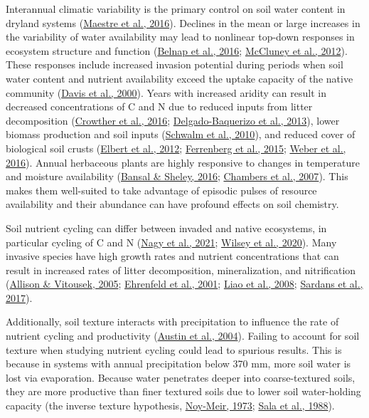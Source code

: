 \documentclass[
  11pt,
  a4paper,
]{article}
\begin{document}
Interannual climatic variability is the primary control on soil water content in dryland systems (\protect\hyperlink{ref-Maestre2016}{Maestre et al., 2016}). Declines in the mean or large increases in the variability of water availability may lead to nonlinear top-down responses in ecosystem structure and function (\protect\hyperlink{ref-Belnap2016}{Belnap et al., 2016}; \protect\hyperlink{ref-McCluney2012}{McCluney et al., 2012}). These responses include increased invasion potential during periods when soil water content and nutrient availability exceed the uptake capacity of the native community (\protect\hyperlink{ref-Davis2000}{Davis et al., 2000}). Years with increased aridity can result in decreased concentrations of C and N due to reduced inputs from litter decomposition (\protect\hyperlink{ref-Crowther2016}{Crowther et al., 2016}; \protect\hyperlink{ref-Delgado-Baquerizo2013}{Delgado-Baquerizo et al., 2013}), lower biomass production and soil inputs (\protect\hyperlink{ref-Schwalm2010}{Schwalm et al., 2010}), and reduced cover of biological soil crusts (\protect\hyperlink{ref-Elbert2012}{Elbert et al., 2012}; \protect\hyperlink{ref-Ferrenberg2015}{Ferrenberg et al., 2015}; \protect\hyperlink{ref-Weber2016}{Weber et al., 2016}). Annual herbaceous plants are highly responsive to changes in temperature and moisture availability (\protect\hyperlink{ref-Bansal2016}{Bansal \& Sheley, 2016}; \protect\hyperlink{ref-Chambers2007}{Chambers et al., 2007}). This makes them well-suited to take advantage of episodic pulses of resource availability and their abundance can have profound effects on soil chemistry.

Soil nutrient cycling can differ between invaded and native ecosystems, in particular cycling of C and N (\protect\hyperlink{ref-Nagy2021}{Nagy et al., 2021}; \protect\hyperlink{ref-Wilsey2020}{Wilsey et al., 2020}). Many invasive species have high growth rates and nutrient concentrations that can result in increased rates of litter decomposition, mineralization, and nitrification (\protect\hyperlink{ref-Allison2005}{Allison \& Vitousek, 2005}; \protect\hyperlink{ref-Ehrenfeld2001}{Ehrenfeld et al., 2001}; \protect\hyperlink{ref-Liao2008}{Liao et al., 2008}; \protect\hyperlink{ref-Sardans2017}{Sardans et al., 2017}).

Additionally, soil texture interacts with precipitation to influence the rate of nutrient cycling and productivity (\protect\hyperlink{ref-Austin2004}{Austin et al., 2004}). Failing to account for soil texture when studying nutrient cycling could lead to spurious results. This is because in systems with annual precipitation below 370 mm, more soil water is lost via evaporation. Because water penetrates deeper into coarse-textured soils, they are more productive than finer textured soils due to lower soil water-holding capacity (the inverse texture hypothesis, \protect\hyperlink{ref-Noy-Meir1973}{Noy-Meir, 1973}; \protect\hyperlink{ref-Sala1988}{Sala et al., 1988}).
\end{document}
